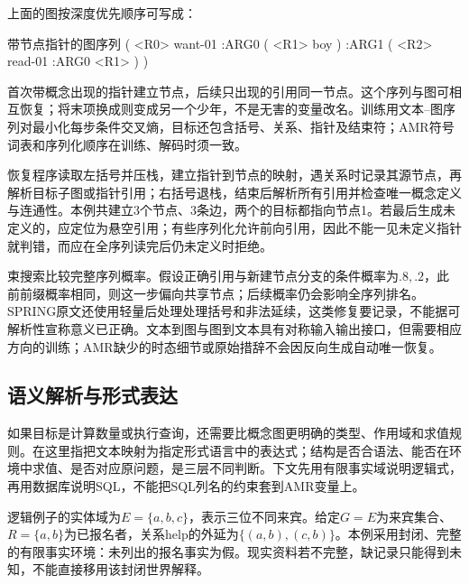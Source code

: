 上面的图按深度优先顺序可写成：
\begin{codeblock}{带节点指针的图序列}
( <R0> want-01
  :ARG0 ( <R1> boy )
  :ARG1 ( <R2> read-01 :ARG0 <R1> ) )
\end{codeblock}
首次带概念出现的指针建立节点，后续只出现的引用同一节点。这个序列与图可相互恢复；将末项换成则变成另一个少年，不是无害的变量改名。训练用文本--图序列对最小化每步条件交叉熵，目标还包含括号、关系、指针及结束符；AMR符号词表和序列化顺序在训练、解码时须一致。

恢复程序读取左括号并压栈，建立指针到节点的映射，遇关系时记录其源节点，再解析目标子图或指针引用；右括号退栈，结束后解析所有引用并检查唯一概念定义与连通性。本例共建立3个节点、3条边，两个的目标都指向节点1。若最后生成未定义的，应定位为悬空引用；有些序列化允许前向引用，因此不能一见未定义指针就判错，而应在全序列读完后仍未定义时拒绝。

束搜索比较完整序列概率。假设正确引用与新建节点分支的条件概率为$.8,.2$，此前前缀概率相同，则这一步偏向共享节点；后续概率仍会影响全序列排名。SPRING原文还使用轻量后处理处理括号和非法延续，这类修复要记录，不能据可解析性宣称意义已正确。文本到图与图到文本具有对称输入输出接口，但需要相应方向的训练；AMR缺少的时态细节或原始措辞不会因反向生成自动唯一恢复。

\subsection{语义解析与形式表达}
\label{sec:nlp-analysis-formal}

如果目标是计算数量或执行查询，还需要比概念图更明确的类型、作用域和求值规则。在这里指把文本映射为指定形式语言中的表达式；结构是否合语法、能否在环境中求值、是否对应原问题，是三层不同判断。下文先用有限事实域说明逻辑式，再用数据库说明SQL，不能把SQL列名的约束套到AMR变量上。

逻辑例子的实体域为$E=\{a,b,c\}$，表示三位不同来宾。给定$G=E$为来宾集合、$R=\{a,b\}$为已报名者，关系$\mathrm{help}$的外延为$\{(a,b),(c,b)\}$。本例采用封闭、完整的有限事实环境：未列出的报名事实为假。现实资料若不完整，缺记录只能得到未知，不能直接移用该封闭世界解释。


